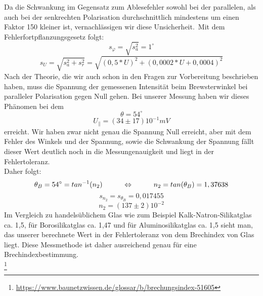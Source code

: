 Da die Schwankung im Gegensatz zum Ablesefehler sowohl bei der parallelen, als auch bei der senkrechten Polarisation durchschnittlich mindestens um einen Faktor 150 kleiner ist, vernachlässigen wir diese Unsicherheit.\
Mit dem Fehlerfortpflanzungsgesetz folgt:\
\begin{equation}
s_\varphi=\sqrt{s_a^2}=1^\circ
\end{equation}
\begin{equation}
s_U=\sqrt{s_a^2+s_r^2}=\sqrt{(0,5*U)^2+(0,0002*U+0,0004)^2}
\end{equation}
Nach der Theorie, die wir auch schon in den Fragen zur Vorbereitung beschrieben haben, muss die  Spannung der gemessenen Intensität beim Brewsterwinkel bei paralleler Polarisation gegen Null gehen. Bei unserer Messung haben wir dieses Phänomen bei dem\\
\begin{equation}
\theta = 54^\circ
\end{equation}
\begin{equation}
\boxed{U_{\parallel}=(34\pm17)10^{-1} mV}
\end{equation}
erreicht. Wir haben zwar nicht genau die Spannung Null erreicht, aber mit dem Fehler des Winkels und der Spannung, sowie die Schwankung der Spannung fällt dieser Wert deutlich noch in die Messungenauigkeit und liegt in der Fehlertoleranz. \\
Daher folgt:\\
\begin{equation}
\theta_B=54^\circ=tan^{-1}(n_2) \tab \Leftrightarrow \tab n_2=tan(\theta_B)=1,37638
\end{equation}
\begin{equation}
s_{n_2}=s_{\theta_B}=0,017455
\end{equation}
\begin{equation}
\boxed{n_2=(137\pm2)10^{-2}}
\end{equation}
Im Vergleich zu handelsüblichem Glas wie zum Beispiel Kalk-Natron-Silikatglas ca. 1,5, für Borosilikatglas ca. 1,47 und für Aluminosilikatglas ca. 1,5 sieht man, das unserer berechnete Wert in der Fehlertoleranz von dem Brechindex von Glas liegt. Diese Messmethode ist daher ausreichend genau für eine Brechindexbestimmung. \\
\footnote{\url{https://www.baunetzwissen.de/glossar/b/brechungsindex-51605}}

